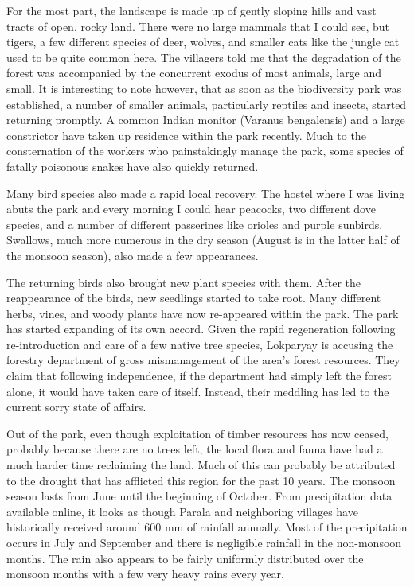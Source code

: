 \documentclass{report}
\begin{document}
For the most part, the landscape is made up of gently sloping hills and vast tracts of open, rocky land. There were no large mammals that I could see, but tigers, a few different species of deer, wolves, and smaller cats like the jungle cat used to be quite common here. The villagers told me that the degradation of the forest was accompanied by the concurrent exodus of most animals, large and small. It is interesting to note however, that as soon as the biodiversity park was established, a number of smaller animals, particularly reptiles and insects, started returning promptly. A common Indian monitor (Varanus bengalensis) and a large constrictor have taken up residence within the park recently. Much to the consternation of the workers who painstakingly manage the park, some species of fatally poisonous snakes have also quickly returned.

Many bird species also made a rapid local recovery. The hostel where I was living abuts the park and every morning I could hear peacocks, two different dove species, and a number of different passerines like orioles and purple sunbirds. Swallows, much more numerous in the dry season (August is in the latter half of the monsoon season), also made a few appearances.

The returning birds also brought new plant species with them. After the reappearance of the birds, new seedlings started to take root. Many different herbs, vines, and woody plants have now re-appeared within the park. The park has started expanding of its own accord. Given the rapid regeneration following re-introduction and care of a few native tree species, Lokparyay is accusing the forestry department of gross mismanagement of the area's forest resources. They claim that following independence, if the department had simply left the forest alone, it would have taken care of itself. Instead, their meddling has led to the current sorry state of affairs.

Out of the park, even though exploitation of timber resources has now ceased, probably because there are no trees left, the local flora and fauna have had a much harder time reclaiming the land. Much of this can probably be attributed to the drought that has afflicted this region for the past 10 years. The monsoon season lasts from June until the beginning of October. From precipitation data available online, it looks as though Parala and neighboring villages have historically received around 600 mm of rainfall annually. Most of the precipitation occurs in July and September and there is negligible rainfall in the non-monsoon months. The rain also appears to be fairly uniformly distributed over the monsoon months with a few very heavy rains every year.
\end{document}
